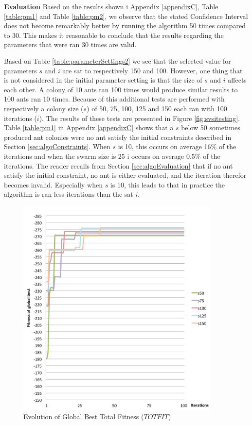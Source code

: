 \textbf{Evaluation}
\newline
Based on the results shown i Appendix \ref{appendixC}, Table \vref{table:pm1} and Table \vref{table:pm2}, we observe that the stated Confidence Interval does not become remarkably better by running the algorithm 50 times compared to 30. This makes it reasonable to conclude that the results regarding the parameters that were ran 30 times are valid. 
\newline

Based on Table \vref{table:parameterSettings2} we see that the selected value for parameters $s$ and $i$ are sat to respectively 150 and 100. However, one thing that is not considered in the initial parameter setting is that the size of $s$ and $i$ affects each other. A colony of 10 ants ran 100 times would produce similar results to 100 ants ran 10 times. Because of this additional tests are performed with respectively a colony size ($s$) of 50, 75, 100, 125 and 150 each ran with 100 iterations ($i$). The results of these tests are presented in Figure \vref{fig:svsitesting}. Table \vref{table:pm1} in Appendix \ref{appendixC} shows that a $s$ below 50 sometimes produced ant colonies were no ant satisfy the initial constraints described in Section \vref{sec:algoConstraints}. When $s$ is 10, this occurs on average 16\% of the iterations and when the swarm size is 25 i occurs on average 0.5\% of the iterations. The reader recalls from Section \vref{sec:algoEvaluation} that if no ant satisfy the initial constraint, no ant is either evaluated, and the iteration therefor becomes invalid. Especially when $s$ is 10, this leads to that in practice the algorithm is ran less iterations than the sat $i$. 

\begin{figure}[H]
\begin{center}
  \includegraphics[width=4in]{assets/svsitest.png}
  \end{center}
  \caption{Evolution of Global Best Total Fitness ($TOTFIT$)}
  \label{fig:svsitesting} 
\end{figure}

